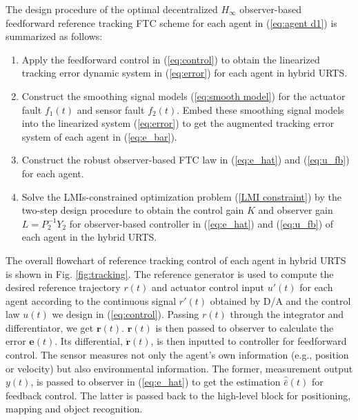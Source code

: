 \documentclass{ieeeaccess}
\begin{document}
The design procedure of the optimal decentralized $H_\infty$ observer-based feedforward reference tracking FTC scheme for each agent in (\ref{eq:agent d1}) is summarized as follows:
\begin{enumerate}
    \item Apply the feedforward control in (\ref{eq:control}) to obtain the linearized tracking error dynamic system in (\ref{eq:error}) for each agent in hybrid URTS.
    \item Construct the smoothing signal models (\ref{eq:smooth model}) for the actuator fault $f_1(t)$ and sensor fault $f_2(t)$. Embed these smoothing signal models into the linearized system (\ref{eq:error}) to get the augmented tracking error system of each agent in (\ref{eq:e_bar}).
    \item Construct the robust observer-based FTC law in (\ref{eq:e_hat}) and (\ref{eq:u_fb}) for each agent.
    \item Solve the LMIs-constrained optimization problem (\ref{LMI constraint}) by the two-step design procedure to obtain the control gain $K$ and observer gain $L=P_2^{-1}Y_2$ for observer-based controller in (\ref{eq:e_hat}) and (\ref{eq:u_fb}) of each agent in the hybrid URTS.
\end{enumerate}

The overall flowchart of reference tracking control of each agent in hybrid URTS is shown in Fig. \ref{fig:tracking}. The reference generator is used to compute the desired reference trajectory $r(t)$ and actuator control input $u'(t)$ for each agent according to the continuous signal $r'(t)$ obtained by D/A and the control law $u(t)$ we design in (\ref{eq:control}). Passing $r(t)$ through the integrator and differentiator, we get $\pmb{r}(t)$. $\pmb{r}(t)$ is then passed to observer to calculate the error $\pmb{e}(t)$. Its differential, $\dot{\pmb{r}}(t)$, is then inputted to controller for feedforward control. The sensor measures not only the agent's own information (e.g., position or velocity) but also environmental information. The former, measurement output $y(t)$, is passed to observer in (\ref{eq:e_hat}) to get the estimation $\hat{\bar{e}}(t)$ for feedback control. The latter is passed back to the high-level block for positioning, mapping and object recognition.
\end{document}
